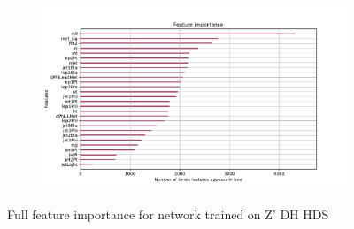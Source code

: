 \documentclass[12pt, a4paper]{book}
\begin{document}
\begin{figure}[!ht]
      \begin{subfigure}[b]{0.7\textwidth}
         \centering
         \includegraphics[width=1\textwidth]{XGBoost/DH_HDS/feature_importance/weight.pdf}
      \end{subfigure}
   \caption{Full feature importance for network trained on Z' DH HDS}
\end{figure}
\end{document}
